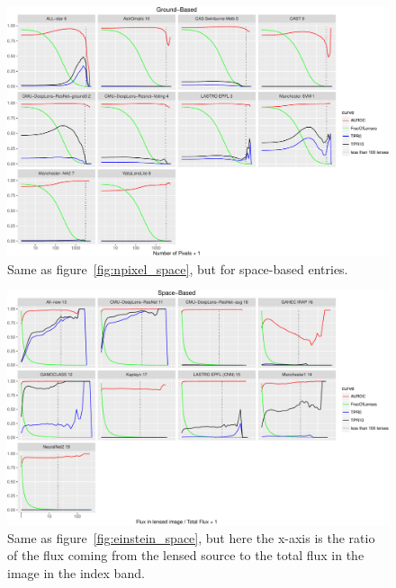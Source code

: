 \documentclass[useAMS,usenatbib]{mnras}
\begin{document}
\begin{figure}
 \includegraphics[width=2\columnwidth]{figures/npixel_ground.pdf}
 \caption{Same as figure~\ref{fig:npixel_space}, but for space-based entries.}
 \label{fig:npixel_ground}
\end{figure}

\begin{figure}
 \includegraphics[width=2\columnwidth]{figures/flux_contrast_space.pdf}
  \caption{Same as figure~\ref{fig:einstein_space}, but here the x-axis is the ratio of the flux coming from the lensed source to the total flux in the image in the index band.}
 \label{fig:flux_contrast_space}
\end{figure}
\end{document}
